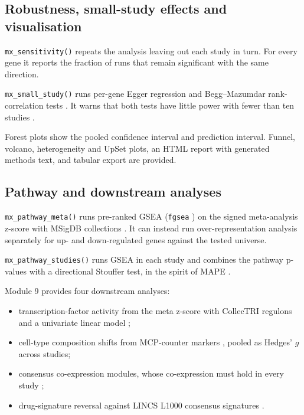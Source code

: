 \documentclass[11pt,a4paper]{article}
\begin{document}
\subsection{Robustness, small-study effects and visualisation}
\texttt{mx\_sensitivity()} repeats the analysis leaving out each study in turn. For every gene it reports the fraction of runs that remain significant with the same direction.

\texttt{mx\_small\_study()} runs per-gene Egger regression \cite{egger1997bias} and Begg--Mazumdar rank-correlation tests \cite{begg1994operating}. It warns that both tests have little power with fewer than ten studies \cite{sterne2011recommendations}.

Forest plots show the pooled confidence interval and prediction interval. Funnel, volcano, heterogeneity and UpSet plots, an HTML report with generated methods text, and tabular export are provided.

\subsection{Pathway and downstream analyses}
\texttt{mx\_pathway\_meta()} runs pre-ranked GSEA (\texttt{fgsea} \cite{korotkevich2016fgsea, subramanian2005gsea}) on the signed meta-analysis z-score with MSigDB collections \cite{liberzon2015hallmark}. It can instead run over-representation analysis separately for up- and down-regulated genes against the tested universe.

\texttt{mx\_pathway\_studies()} runs GSEA in each study and combines the pathway p-values with a directional Stouffer test, in the spirit of MAPE \cite{shen2010mape}.

Module 9 provides four downstream analyses:
\begin{itemize}[noitemsep,topsep=2pt]
    \item transcription-factor activity from the meta z-score with CollecTRI regulons and a univariate linear model \cite{muellerdott2023collectri, badiaimompel2022decoupler};
    \item cell-type composition shifts from MCP-counter markers \cite{becht2016mcpcounter}, pooled as Hedges' $g$ across studies;
    \item consensus co-expression modules, whose co-expression must hold in every study \cite{langfelder2008wgcna};
    \item drug-signature reversal against LINCS L1000 consensus signatures \cite{subramanian2017l1000, lamb2006cmap}.
\end{itemize}
\end{document}
